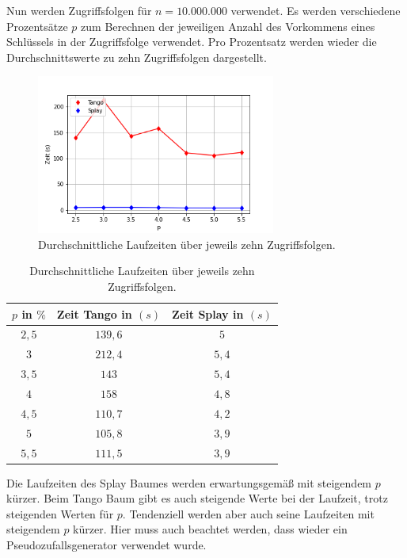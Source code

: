 \documentclass[a4paper,12pt]{article}
\begin{document}
\noindent Nun werden Zugriffsfolgen für $n = 10.000.000$ verwendet. Es werden verschiedene Prozentsätze $p$ zum Berechnen der jeweiligen Anzahl des Vorkommens eines Schlüssels in der Zugriffsfolge verwendet. Pro Prozentsatz werden wieder die Durchschnittswerte zu zehn Zugriffsfolgen dargestellt. 
\begin{figure}[H]
	\centering
	\includegraphics[width=0.7\textwidth]{Medien/laufzeittest/diagramm/staticfinger4}
	\caption{Durchschnittliche Laufzeiten über jeweils zehn Zugriffsfolgen.}
\end{figure}
\begin{table}[H]
	\begin{center}
		\begin{tabular}[c]{|c|c|c|}
			\hline
			$p$ in $\%$ & Zeit Tango in $\left(s\right)$ &Zeit Splay in $\left(s\right)$ \\
			\hline
			$2,5$  & $139,6$ &$5$  \\
			\hline
			$3$  &   $212,4$ &  $5,4$  \\
			\hline
			$3,5$  & $143$ &$5,4$  \\
			\hline
			$4$ &    $158$ &$4,8$ \\
			\hline
			$4,5$  & $110,7$ &$4,2$  \\
			\hline
			$5$  &   $105,8$ &  $3,9$  \\
			\hline
			$5,5$  & $111,5$ &$3,9$  \\
			\hline
		\end{tabular}
		\caption{Durchschnittliche Laufzeiten über jeweils zehn Zugriffsfolgen.} 
	\end{center}
\end{table}

\noindent Die Laufzeiten des Splay Baumes werden erwartungsgemäß mit steigendem $p$ kürzer. Beim Tango Baum gibt es auch steigende Werte bei der Laufzeit, trotz steigenden Werten für $p$. Tendenziell werden aber auch seine Laufzeiten mit steigendem $p$ kürzer. Hier muss auch beachtet werden, dass wieder ein Pseudozufallsgenerator verwendet wurde.
\end{document}
